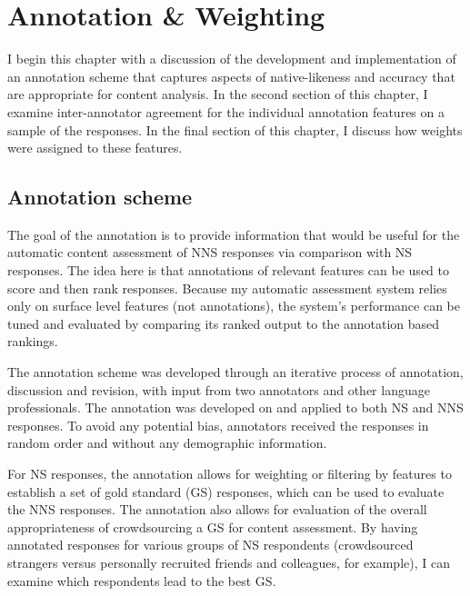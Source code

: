 \chapter{Annotation \& Weighting}
\label{chap:annotation}

I begin this chapter with a discussion of the development and implementation of an annotation scheme that captures aspects of native-likeness and accuracy that are appropriate for content analysis. In the second section of this chapter, I examine inter-annotator agreement for the individual annotation features on a sample of the responses. In the final section of this chapter, I discuss how weights were assigned to these features.

\section{Annotation scheme}
\label{sec:scheme}
The goal of the annotation is to provide information that would be useful for the automatic content assessment of NNS responses via comparison with NS responses. The idea here is that annotations of relevant features can be used to score and then rank responses. Because my automatic assessment system relies only on surface level features (not annotations), the system's performance can be tuned and evaluated by comparing its ranked output to the annotation based rankings.
%

The annotation scheme was developed through an iterative process of annotation, discussion and revision, with input from two annotators and other language professionals. The annotation was developed on and applied to both NS and NNS responses. To avoid any potential bias, annotators received the responses in random order and without any demographic information.

For NS responses, the annotation allows for weighting or filtering by features to establish a set of gold standard (GS) responses, which can be used to evaluate the NNS responses. The annotation also allows for evaluation of the overall appropriateness of crowdsourcing a GS for content assessment. By having annotated responses for various groups of NS respondents (crowdsourced strangers versus personally recruited friends and colleagues, for example), I can examine which respondents lead to the best GS.

